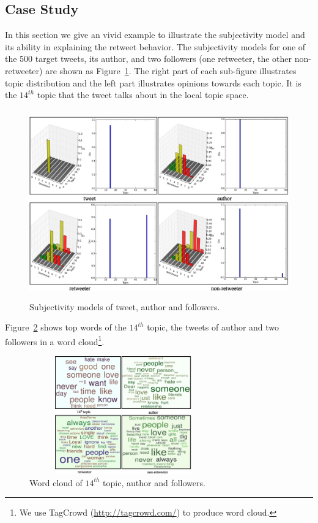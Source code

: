 \documentclass[twocolumn]{svjour3}          %
\begin{document}
\subsection{Case Study}
\label{example}
In this section we give an vivid example to illustrate the subjectivity model and its ability in explaining the retweet behavior. 
The subjectivity models for one of the 500 target tweets, its author, and two followers (one retweeter, the other non-retweeter) are shown as Figure~\ref{fig5}. 
The right part of each sub-figure illustrates topic distribution and the left part illustrates opinions towards each topic. 
It is the $ 14^{th} $ topic that the tweet talks about in the local topic space. 
\begin{figure}[htb]
\centering
\includegraphics[width=5.5in,height=3.2in]{fig5.eps}
\caption{Subjectivity models of tweet, author and followers.}
\label{fig5}
\end{figure}
Figure~\ref{fig6} shows top words of the $ 14^{th} $ topic, the tweets of author and two followers in a word cloud\footnote{We use TagCrowd (\url{http://tagcrowd.com/}) to produce word cloud.}.
\begin{figure}[htb]
\centering
\includegraphics[width=3.2in,height=2.0in]{fig6.eps}
\caption{Word cloud of $ 14^{th} $ topic, author and followers.}
\label{fig6}
\end{figure}
\end{document}
